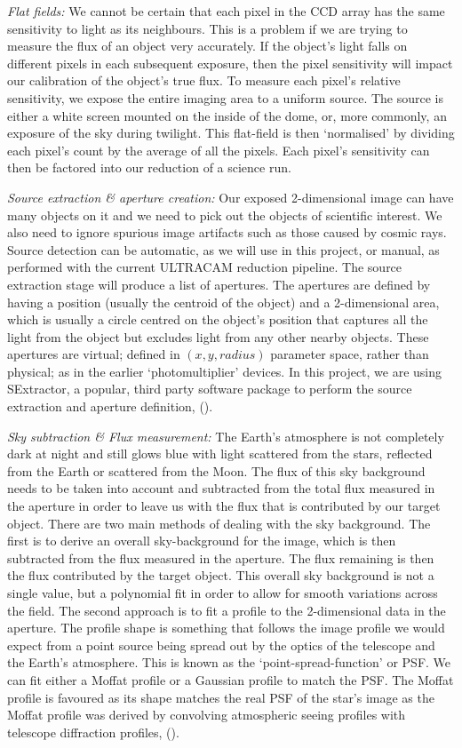 \emph{Flat fields:}
We cannot be certain that each pixel in the CCD array has the same sensitivity to light as its neighbours. This is a problem if we are trying to measure the flux of an object very accurately. If the object's light falls on different pixels in each subsequent exposure, then the pixel sensitivity will impact our calibration of the object's true flux. To measure each pixel's relative sensitivity, we expose the entire imaging area to a uniform source. The source is either a white screen mounted on the inside of the dome, or, more commonly, an exposure of the sky during twilight. This flat-field is then `normalised' by dividing each pixel's count by the average of all the pixels. Each pixel's sensitivity can then be factored into our reduction of a science run. 

\emph{Source extraction \& aperture creation:}
Our exposed 2-dimensional image can have many objects on it and we need to pick out the objects of scientific interest. We also need to ignore spurious image artifacts such as those caused by cosmic rays. Source detection can be automatic, as we will use in this project, or manual, as performed with the current ULTRACAM reduction pipeline. The source extraction stage will produce a list of apertures. The apertures are defined by having a position (usually the centroid of the object) and a 2-dimensional area, which is usually a circle centred on the object's position that captures all the light from the object but excludes light from any other nearby objects. These apertures are virtual; defined in $(x, y, radius)$ parameter space, rather than physical; as in the earlier `photomultiplier' devices. In this project, we are using {SExtractor}, a popular, third party software package to perform the source extraction and aperture definition, (\cite{bertin}).

\emph{Sky subtraction \& Flux measurement:}
The Earth's atmosphere is not completely dark at night and still glows blue with light scattered from the stars, reflected from the Earth or scattered from the Moon. The flux of this sky background needs to be taken into account and subtracted from the total flux measured in the aperture in order to leave us with the flux that is contributed by our target object. There are two main methods of dealing with the sky background. The first is to derive an overall sky-background for the image, which is then subtracted from the flux measured in the aperture. The flux remaining is then the flux contributed by the target object. This overall sky background is not a single value, but a polynomial fit in order to allow for smooth variations across the field. The second approach is to fit a profile to the 2-dimensional data in the aperture. The profile shape is something that follows the image profile we would expect from a point source being spread out by the optics of the telescope and the Earth's atmosphere. This is known as the `point-spread-function' or {PSF}. We can fit either a Moffat profile or a Gaussian profile to match the PSF. The Moffat profile is favoured as its shape matches the real PSF of the star's image as the Moffat profile was derived by convolving atmospheric seeing profiles with telescope diffraction profiles, (\cite{Moffat69}). 

